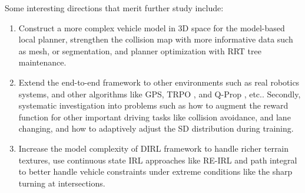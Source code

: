 \documentclass[../thesis.tex]{subfiles}
\begin{document}

Some interesting directions that merit further study include:
\begin{enumerate}
	\item 
	Construct a more complex vehicle model in 3D space for the model-based local planner, strengthen the collision map with more informative data such as mesh, or segmentation, and planner optimization with RRT tree maintenance.

	\item
	Extend the end-to-end framework to other environments such as real robotics systems, and other algorithms like GPS\cite{levine2013guided}, TRPO \cite{TRPO}, and Q-Prop \cite{DBLP:journals/corr/GuLGTL16}, etc.. Secondly, systematic investigation into problems such as how to augment the reward function for other important driving tasks like collision avoidance, and lane changing, and how to adaptively adjust the SD distribution during training. 

	\item
	Increase the model complexity of DIRL framework to handle richer terrain textures, use continuous state IRL approaches like RE-IRL \cite{boularias2011relative} and path integral \cite{aghasadeghi2011maximum} to better handle vehicle constraints under extreme conditions like the sharp turning at intersections.

\end{enumerate}
\end{document}
